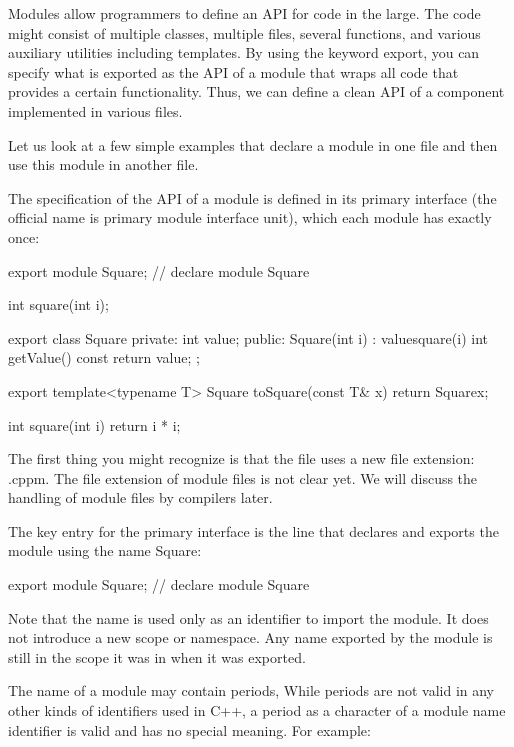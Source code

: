 
Modules allow programmers to define an API for code in the large. The code might consist of multiple classes, multiple files, several functions, and various auxiliary utilities including templates. By using the keyword export, you can specify what is exported as the API of a module that wraps all code that provides a certain functionality. Thus, we can define a clean API of a component implemented in various files.

Let us look at a few simple examples that declare a module in one file and then use this module in another file.


The specification of the API of a module is defined in its primary interface (the official name is primary module interface unit), which each module has exactly once:


\begin{cpp}
export module Square; // declare module Square

int square(int i);

export class Square {
private:
	int value;
public:
	Square(int i)
	: value{square(i)} {
	}
	int getValue() const {
		return value;
	}
};
	
export template<typename T>
Square toSquare(const T& x) {
	return Square{x};
}
	
int square(int i) {
	return i * i;
}
\end{cpp}

The first thing you might recognize is that the file uses a new file extension: .cppm. The file extension of module files is not clear yet. We will discuss the handling of module files by compilers later.

The key entry for the primary interface is the line that declares and exports the module using the name Square:

\begin{cpp}
export module Square; // declare module Square
\end{cpp}

Note that the name is used only as an identifier to import the module. It does not introduce a new scope or namespace. Any name exported by the module is still in the scope it was in when it was exported.

The name of a module may contain periods, While periods are not valid in any other kinds of identifiers used in C++, a period as a character of a module name identifier is valid and has no special meaning. For example:

